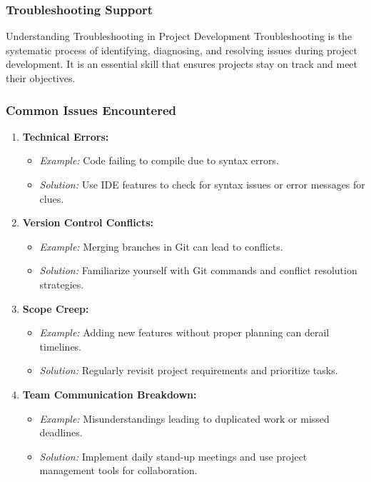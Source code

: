 \documentclass[aspectratio=169]{beamer}
\begin{document}
\begin{frame}[fragile]
    \frametitle{Troubleshooting Support}
    \begin{block}{Understanding Troubleshooting in Project Development}
        Troubleshooting is the systematic process of identifying, diagnosing, and resolving issues during project development. It is an essential skill that ensures projects stay on track and meet their objectives.
    \end{block}
\end{frame}

\begin{frame}[fragile]
    \frametitle{Common Issues Encountered}
    \begin{enumerate}
        \item \textbf{Technical Errors:}
            \begin{itemize}
                \item \textit{Example:} Code failing to compile due to syntax errors.
                \item \textit{Solution:} Use IDE features to check for syntax issues or error messages for clues.
            \end{itemize}
        \item \textbf{Version Control Conflicts:}
            \begin{itemize}
                \item \textit{Example:} Merging branches in Git can lead to conflicts.
                \item \textit{Solution:} Familiarize yourself with Git commands and conflict resolution strategies.
            \end{itemize}
        \item \textbf{Scope Creep:}
            \begin{itemize}
                \item \textit{Example:} Adding new features without proper planning can derail timelines.
                \item \textit{Solution:} Regularly revisit project requirements and prioritize tasks.
            \end{itemize}
        \item \textbf{Team Communication Breakdown:}
            \begin{itemize}
                \item \textit{Example:} Misunderstandings leading to duplicated work or missed deadlines.
                \item \textit{Solution:} Implement daily stand-up meetings and use project management tools for collaboration.
            \end{itemize}
    \end{enumerate}
\end{frame}
\end{document}
